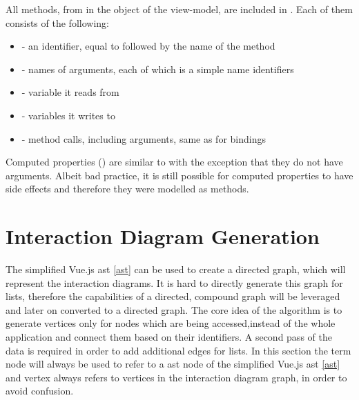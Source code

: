 All methods, from in the  object of the view-model, are included in . Each of them consists of the following:
\begin{itemize}
    \item {} - an identifier, equal to  followed by the name of the method
    \item {} - names of arguments, each of which is a simple name identifiers
    \item {} - variable it reads from
    \item {} - variables it writes to
    \item {} - method calls, including arguments, same as for bindings 
\end{itemize}

Computed properties () are similar to  with the exception that they do not have arguments. Albeit bad practice, it is still possible for computed properties to have side effects and therefore they were modelled as methods.

\section{Interaction Diagram Generation}

The simplified Vue.js \gls{ast} \ref{ast} can be used to create a directed graph, which will represent the interaction diagrams. It is hard to directly generate this graph for lists, therefore the capabilities of a directed, compound graph will be leveraged and later on converted to a directed graph. 
The core idea of the algorithm is to generate vertices only for nodes which are being accessed,instead of the whole application and connect them based on their identifiers. A second pass of the data is required in order to add additional edges for lists. In this section the term node will always be used to refer to a \gls{ast} node of the simplified Vue.js \gls{ast} \ref{ast} and vertex always refers to vertices in the interaction diagram graph, in order to avoid confusion.


